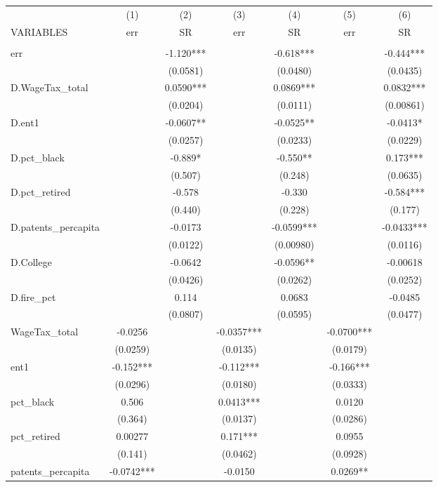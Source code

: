 \begin{tabular}{lcccccc} \hline
 & (1) & (2) & (3) & (4) & (5) & (6) \\
VARIABLES & err & SR & err & SR & err & SR \\ \hline
 &  &  &  &  &  &  \\
err &  & -1.120*** &  & -0.618*** &  & -0.444*** \\
 &  & (0.0581) &  & (0.0480) &  & (0.0435) \\
D.WageTax\_total &  & 0.0590*** &  & 0.0869*** &  & 0.0832*** \\
 &  & (0.0204) &  & (0.0111) &  & (0.00861) \\
D.ent1 &  & -0.0607** &  & -0.0525** &  & -0.0413* \\
 &  & (0.0257) &  & (0.0233) &  & (0.0229) \\
D.pct\_black &  & -0.889* &  & -0.550** &  & 0.173*** \\
 &  & (0.507) &  & (0.248) &  & (0.0635) \\
D.pct\_retired &  & -0.578 &  & -0.330 &  & -0.584*** \\
 &  & (0.440) &  & (0.228) &  & (0.177) \\
D.patents\_percapita &  & -0.0173 &  & -0.0599*** &  & -0.0433*** \\
 &  & (0.0122) &  & (0.00980) &  & (0.0116) \\
D.College &  & -0.0642 &  & -0.0596** &  & -0.00618 \\
 &  & (0.0426) &  & (0.0262) &  & (0.0252) \\
D.fire\_pct &  & 0.114 &  & 0.0683 &  & -0.0485 \\
 &  & (0.0807) &  & (0.0595) &  & (0.0477) \\
WageTax\_total & -0.0256 &  & -0.0357*** &  & -0.0700*** &  \\
 & (0.0259) &  & (0.0135) &  & (0.0179) &  \\
ent1 & -0.152*** &  & -0.112*** &  & -0.166*** &  \\
 & (0.0296) &  & (0.0180) &  & (0.0333) &  \\
pct\_black & 0.506 &  & 0.0413*** &  & 0.0120 &  \\
 & (0.364) &  & (0.0137) &  & (0.0286) &  \\
pct\_retired & 0.00277 &  & 0.171*** &  & 0.0955 &  \\
 & (0.141) &  & (0.0462) &  & (0.0928) &  \\
patents\_percapita & -0.0742*** &  & -0.0150 &  & 0.0269** &  \\

\end{tabular}

